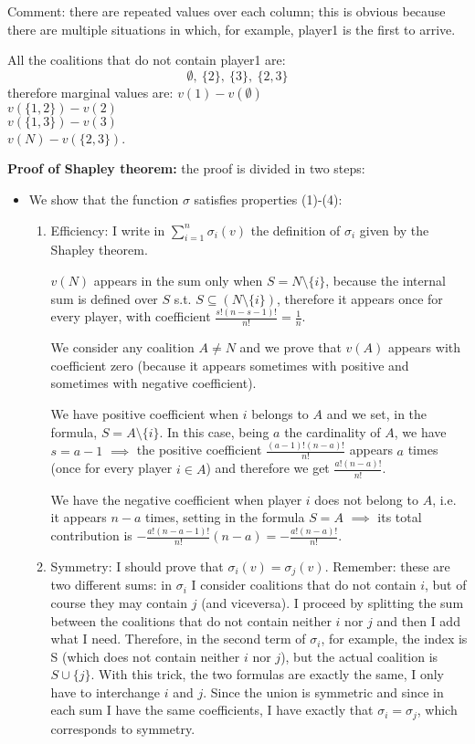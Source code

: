 \noindent Comment: there are repeated values over each column; this is obvious 
because there are multiple situations in which, for example, player1 is the 
first to arrive. 

\noindent All the coalitions that do not contain player1 are:
\[
	\emptyset,~ \{2\},~ \{3\},~ \{2,3\}
\]
therefore marginal values are:
$v(1) - v(\emptyset)$\\
$v(\{1,2\}) - v(2)$\\
$v(\{1,3\}) - v(3)$\\
$v(N) - v(\{2,3\})$.

\bigskip
\noindent \textbf{Proof of Shapley theorem:} the proof is divided in two steps:
\begin{itemize}
	\item We show that the function $\sigma$ satisfies properties (1)-(4):
	\begin{enumerate}
		\item Efficiency: I write in $\sum_{i=1}^n{\sigma_i(v)}$ the definition 
		of $\sigma_i$ given by the Shapley theorem. 
		
		\noindent $v(N)$ appears in the sum 
		only when $S = N \setminus \{i\}$, because the internal sum is defined over $S$ s.t. 
		$S \subseteq (N \setminus \{i\})$, therefore it appears once for every player, with coefficient $\frac{s!(n-s-1)!}{n!} = \frac{1}{n}$. 
		
		\noindent
		We consider any coalition $A \neq N$ and we prove that $v(A)$ appears with coefficient 
		zero (because it appears sometimes with positive and sometimes with negative 
		coefficient). 
		
		\noindent We have positive coefficient when $i$ belongs 
		to $A$ and we set, in the formula, $S = A \setminus \{i\}$. In this case, being $a$ the cardinality of $A$, we have $s = a-1$ $\implies$ the positive coefficient $\frac{(a-1)!(n-a)!}{n!}$ appears $a$ times (once for every player $i \in A$) and therefore we get $\frac{a!(n-a)!}{n!}$.
		
		\noindent
		We have the negative coefficient when player $i$ does not belong to $A$, i.e. 
		it appears $n-a$ times, setting in the formula $S = A$ $\implies$ its total contribution is $- \frac{a!(n-a-1)!}{n!}(n-a) = 
		- \frac{a!(n-a)!}{n!}$.
	
		\item Symmetry: I should prove that $\sigma_i(v) = \sigma_j(v)$. 
		Remember: these are two different sums: in $\sigma_i$ I consider coalitions 
		that do not contain $i$, but of course they may contain $j$ (and viceversa). 
		I proceed by splitting the sum between the coalitions that do not contain 
		neither $i$ nor $j$ and then I add what I need. Therefore, in the second 
		term of $\sigma_i$, for example, the index is S (which does not contain 
		neither $i$ nor $j$), but the actual coalition is $S \cup \{j\}$. 
		With this trick, the two formulas are exactly the same, I only have to 
		interchange $i$ and $j$. Since the union is symmetric and since in each 
		sum I have the same coefficients, I have exactly that $\sigma_i = \sigma_j$, 
		which corresponds to symmetry.
		

\end{enumerate}
\end{itemize}
